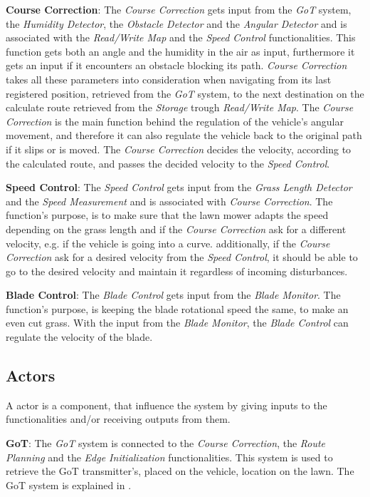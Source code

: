 \textbf{Course Correction}:
The \textit{Course Correction} gets input from the \textit{GoT} system, the \textit{Humidity Detector}, the \textit{Obstacle Detector} and the \textit{Angular Detector} and is associated with the \textit{Read/Write Map} and the \textit{Speed Control} functionalities. This function gets both an angle and the humidity in the air as input, furthermore it gets an input if it encounters an obstacle blocking its path. \textit{Course Correction} takes all these parameters into consideration when navigating from its last registered position, retrieved from the \textit{GoT} system, to the next destination on the calculate route retrieved from the \textit{Storage} trough \textit{Read/Write Map}. The \textit{Course Correction} is the main function behind the regulation of the vehicle's angular movement, and therefore it can also regulate the vehicle back to the original path if it slips or is moved. The  \textit{Course Correction} decides the velocity, according to the calculated route, and passes the decided velocity to the \textit{Speed Control}.

\textbf{Speed Control}:
The \textit{Speed Control} gets input from  the \textit{Grass Length Detector} and the \textit{Speed Measurement} and is associated with \textit{Course Correction}. The function's purpose, is to make sure that the lawn mower adapts the speed depending on the grass length and if the \textit{Course Correction} ask for a different velocity, e.g. if the vehicle is going into a curve. additionally, if the \textit{Course Correction} ask for a desired velocity from the \textit{Speed Control}, it should be able to go to the desired velocity and maintain it regardless of incoming disturbances.

\textbf{Blade Control}:
The \textit{Blade Control} gets input from the \textit{Blade Monitor}. The function's purpose, is keeping the blade rotational speed the same, to make an even cut grass. With the input from the \textit{Blade Monitor}, the \textit{Blade Control} can regulate the velocity of the blade.

\subsection{Actors}
A actor is a component, that influence the system by giving inputs to the functionalities and/or receiving outputs from them.

\textbf{GoT}:
The \textit{GoT} system is connected to the \textit{Course Correction}, the \textit{Route Planning} and the \textit{Edge Initialization} functionalities. This system is used to retrieve the GoT transmitter's, placed on the vehicle, location on the lawn. The GoT system is explained in .

